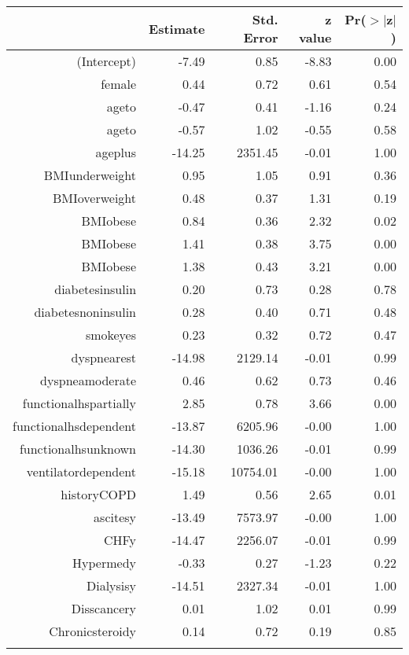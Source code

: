 \bigskip\bigskip
\centering
\begin{tabular}{rrrrr}
  \hline
 & Estimate & Std. Error & z value & Pr($>$$|$z$|$) \\ 
  \hline
(Intercept) & -7.49 & 0.85 & -8.83 & 0.00 \\ 
  female & 0.44 & 0.72 & 0.61 & 0.54 \\ 
  age\-65\-to\-74 & -0.47 & 0.41 & -1.16 & 0.24 \\ 
  age\-75\-to\-84 & -0.57 & 1.02 & -0.55 & 0.58 \\ 
  age\-85\-plus & -14.25 & 2351.45 & -0.01 & 1.00 \\ 
  BMI\-underweight & 0.95 & 1.05 & 0.91 & 0.36 \\ 
  BMI\-overweight & 0.48 & 0.37 & 1.31 & 0.19 \\ 
  BMI\-obese\-1 & 0.84 & 0.36 & 2.32 & 0.02 \\ 
  BMI\-obese\-2 & 1.41 & 0.38 & 3.75 & 0.00 \\ 
  BMI\-obese\-3 & 1.38 & 0.43 & 3.21 & 0.00 \\ 
  diabetes\-insulin & 0.20 & 0.73 & 0.28 & 0.78 \\ 
  diabetes\-noninsulin & 0.28 & 0.40 & 0.71 & 0.48 \\ 
  smoke\-yes & 0.23 & 0.32 & 0.72 & 0.47 \\ 
  dyspnea\-rest & -14.98 & 2129.14 & -0.01 & 0.99 \\ 
  dyspnea\-moderate & 0.46 & 0.62 & 0.73 & 0.46 \\ 
  functional\-hs\-partially & 2.85 & 0.78 & 3.66 & 0.00 \\ 
  functional\-hs\-dependent & -13.87 & 6205.96 & -0.00 & 1.00 \\ 
  functional\-hs\-unknown & -14.30 & 1036.26 & -0.01 & 0.99 \\ 
  ventilator\-dependent & -15.18 & 10754.01 & -0.00 & 1.00 \\ 
  history\-COPD & 1.49 & 0.56 & 2.65 & 0.01 \\ 
  ascites\-y & -13.49 & 7573.97 & -0.00 & 1.00 \\ 
  CHF\-y & -14.47 & 2256.07 & -0.01 & 0.99 \\ 
  Hyper\-med\-y & -0.33 & 0.27 & -1.23 & 0.22 \\ 
  Dialysis\-y & -14.51 & 2327.34 & -0.01 & 1.00 \\ 
  Diss\-cancer\-y & 0.01 & 1.02 & 0.01 & 0.99 \\ 
  Chronic\-steroid\-y & 0.14 & 0.72 & 0.19 & 0.85 \\ 
$$
\end{tabular}
